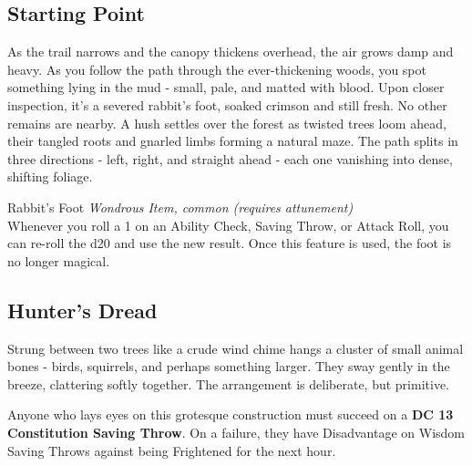\subsection*{ Starting Point}
\begin{DndReadAloud}
	As the trail narrows and the canopy thickens overhead, the air grows damp and heavy. As you follow the path through the ever-thickening woods, you spot something lying in the mud - small, pale, and matted with blood. Upon closer inspection, it's a severed rabbit's foot, soaked crimson and still fresh. No other remains are nearby. A hush settles over the forest as twisted trees loom ahead, their tangled roots and gnarled limbs forming a natural maze. The path splits in three directions - left, right, and straight ahead - each one vanishing into dense, shifting foliage.
\end{DndReadAloud}

%

\vfill\eject
\begingroup
	\DndSetThemeColor[PhbLightGreen]
	\begin{DndComment}{Rabbit's Foot}
		\textit{Wondrous Item, common (requires attunement)}\\
		Whenever you roll a 1 on an Ability Check, Saving Throw, or Attack Roll, you can re-roll the d20 and use the new result. Once this feature is used, the foot is no longer magical.
	\end{DndComment}
\endgroup
\subsection*{ Hunter's Dread}
{\entryfont Strung between two trees like a crude wind chime hangs a cluster of small animal bones - birds, squirrels, and perhaps something larger. They sway gently in the breeze, clattering softly together. The arrangement is deliberate, but primitive.

Anyone who lays eyes on this grotesque construction must succeed on a \textbf{DC 13 Constitution Saving Throw}. On a failure, they have Disadvantage on Wisdom Saving Throws against being Frightened for the next hour.}
